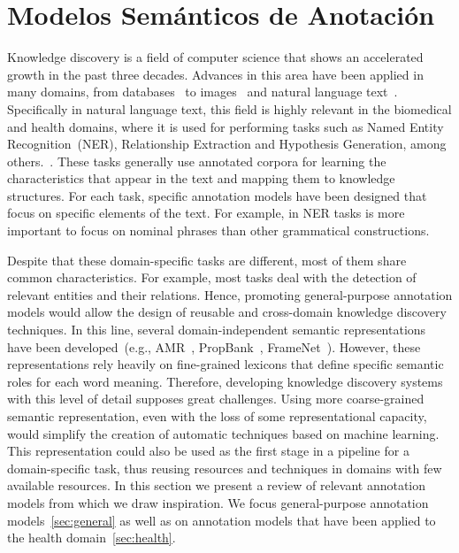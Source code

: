   \section{Modelos Semánticos de Anotación}

  Knowledge discovery is a field of computer science that shows an accelerated growth in the past three decades.
  Advances in this area have been applied in many domains, from databases~\cite{fayyad1996data, knowledgeDatabase} to
  images~\cite{lu2016visual} and natural language text~\cite{carlson2010toward}.
  Specifically in natural language text, this field is highly relevant in the biomedical and health domains,
  where it is used for performing tasks such as
  Named Entity Recognition~(NER), Relationship Extraction and Hypothesis Generation, among others.~\cite{simpson2012biomedical}.
  These tasks generally use annotated corpora for learning the characteristics that appear in the text and mapping them to knowledge structures.
  For each task, specific annotation models have been designed that focus on specific elements of the text.
  For example, in NER tasks is more important to focus on nominal phrases than other grammatical constructions.

  Despite that these domain-specific tasks are different, most of them share common characteristics. For example, most tasks deal with the detection of relevant entities and their relations. Hence, promoting general-purpose annotation models would allow the design of reusable and cross-domain knowledge discovery techniques.
  In this line, several domain-independent semantic representations have been developed~(e.g., AMR~\cite{amr}, PropBank~\cite{propbank}, FrameNet~\cite{framenet}).
  However, these representations rely heavily on fine-grained lexicons that define specific semantic roles for each word meaning. Therefore, developing knowledge discovery systems with this level of detail supposes great challenges. Using more coarse-grained semantic representation, even with the loss of some representational capacity, would simplify the creation of automatic techniques based on machine learning.
  This representation could also be used as the first stage in a pipeline for a domain-specific task, thus reusing resources and techniques in domains with few available resources.
  In this section we present a review of relevant annotation models from which we draw inspiration.
  We focus general-purpose annotation models~\ref{sec:general} as well as on annotation models that have been applied to the health domain~\ref{sec:health}.

